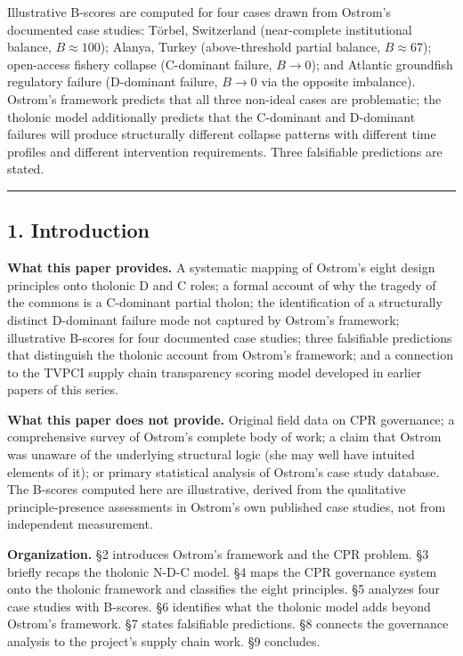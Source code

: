 \documentclass[
  11pt,
  letterpaper,
]{article}
\begin{document}
Illustrative B-scores are computed for four cases drawn from Ostrom's
documented case studies: Törbel, Switzerland (near-complete
institutional balance, \(B \approx 100\)); Alanya, Turkey
(above-threshold partial balance, \(B \approx 67\)); open-access fishery
collapse (C-dominant failure, \(B \to 0\)); and Atlantic groundfish
regulatory failure (D-dominant failure, \(B \to 0\) via the opposite
imbalance). Ostrom's framework predicts that all three non-ideal cases
are problematic; the tholonic model additionally predicts that the
C-dominant and D-dominant failures will produce structurally different
collapse patterns with different time profiles and different
intervention requirements. Three falsifiable predictions are stated.

\begin{center}\rule{0.5\linewidth}{0.5pt}\end{center}

\subsection{1. Introduction}\label{introduction}

\textbf{What this paper provides.} A systematic mapping of Ostrom's
eight design principles onto tholonic D and C roles; a formal account of
why the tragedy of the commons is a C-dominant partial tholon; the
identification of a structurally distinct D-dominant failure mode not
captured by Ostrom's framework; illustrative B-scores for four
documented case studies; three falsifiable predictions that distinguish
the tholonic account from Ostrom's framework; and a connection to the
TVPCI supply chain transparency scoring model developed in earlier
papers of this series.

\textbf{What this paper does not provide.} Original field data on CPR
governance; a comprehensive survey of Ostrom's complete body of work; a
claim that Ostrom was unaware of the underlying structural logic (she
may well have intuited elements of it); or primary statistical analysis
of Ostrom's case study database. The B-scores computed here are
illustrative, derived from the qualitative principle-presence
assessments in Ostrom's own published case studies, not from independent
measurement.

\textbf{Organization.} §2 introduces Ostrom's framework and the CPR
problem. §3 briefly recaps the tholonic N-D-C model. §4 maps the CPR
governance system onto the tholonic framework and classifies the eight
principles. §5 analyzes four case studies with B-scores. §6 identifies
what the tholonic model adds beyond Ostrom's framework. §7 states
falsifiable predictions. §8 connects the governance analysis to the
project's supply chain work. §9 concludes.
\end{document}
